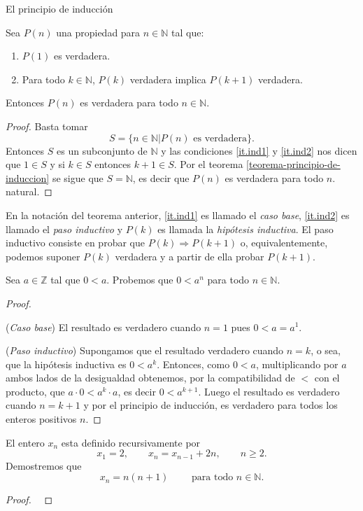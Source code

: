 \begin{section}{El principio de inducción}
\begin{teorema}\label{induccion2} Sea $P(n)$ una propiedad para $n \in \mathbb N$ tal que:
\begin{enumerate}[label=\textit{\alph*)}]
\item\label{it.ind1} $P(1)$ es verdadera.
\item\label{it.ind2} Para todo $k \in \mathbb N$, $P(k)$ verdadera implica $P(k + 1)$ verdadera.
\end{enumerate}
Entonces $P(n)$ es verdadera para todo $n \in \mathbb N$.
\end{teorema}
\begin{proof} Basta tomar
$$S = \{n \in \mathbb N| P(n) \text{ es verdadera} \}.$$
Entonces $S$ es un subconjunto de $\mathbb N$ y las condiciones \ref{it.ind1} y \ref{it.ind2} nos dicen que $1 \in S$ y  si $ k \in S$ entonces $k+1\in S$. Por el teorema \ref{teorema-principio-de-induccion} se sigue que $S= \mathbb N$, es decir que $P(n)$ es verdadera para todo $n$.
natural.
\end{proof}


En la notación del teorema anterior, \ref{it.ind1} es llamado  el {\em caso base}, \ref{it.ind2} es llamado el  {\em paso inductivo} y $P(k)$ es llamada la {\em hipótesis inductiva}. El paso inductivo  consiste en probar que $P(k) \Rightarrow P(k + 1)$ o, equivalentemente, podemos suponer $P(k)$ verdadera y a partir de ella probar $P(k + 1)$. 


\begin{ejemplo}\label{ejemplo141} Sea $a\in \mathbb Z$ tal que $0<a$. Probemos que $0<a^n$ para todo $n \in \mathbb N$.
\end{ejemplo}
\begin{proof}
\

\noindent (\textit{Caso  base}) El resultado es verdadero
cuando $n=1$ pues $ 0 < a=a^1$.

\noindent (\textit{Paso  inductivo})
 Supongamos que el resultado verdadero cuando $n=k$, o sea, que la hipótesis inductiva es $0 < a^k$. Entonces, como $0<a$, multiplicando por $a$ ambos lados de la desigualdad obtenemos, por la compatibilidad de $<$ con el producto, que $a\cdot 0 < a^k \cdot a$, es decir $0<a^{k+1}$.  Luego el resultado es verdadero cuando $n=k+1$ y por el principio de inducción, es verdadero para todos los enteros positivos $n$.
\end{proof}

\begin{ejemplo*} El entero $x_n$ esta definido recursivamente por
$$
x_1=2, \qquad x_n=x_{n-1} +2n, \qquad n\ge 2.
$$
Demostremos que
$$
x_n = n(n+1) \qquad \text{ para todo } n\in \mathbb N.
$$
\end{ejemplo*}
\begin{proof}
\    


\end{proof}
\end{section}
